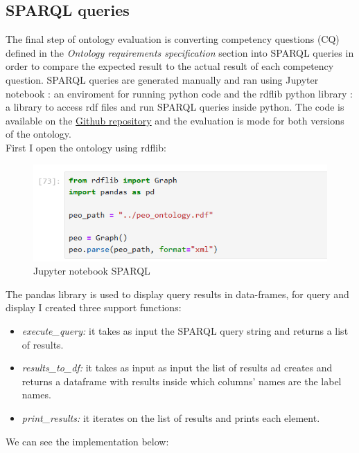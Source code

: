 \subsection{SPARQL queries}
The final step of ontology evaluation is converting competency questions (CQ) defined in the \textit{Ontology requirements specification} section into SPARQL queries in order to compare the expected result to the actual result of each competency question. SPARQL queries are generated manually and ran using Jupyter notebook \cite{jupyter}: an enviroment for running python code and the rdflib python library \cite{rdflib}: a library to access rdf files and run SPARQL queries inside python. The code is available on the \href{https://github.com/simonegramegna/peo/tree/main/evaluation}{Github repository} and the evaluation is mode for both versions of the ontology.\\
First I open the ontology using rdflib:
\begin{figure}[H]
    \centering
    \includegraphics[width=0.9\linewidth]{Figures/fig_45.png}
    \caption{Jupyter notebook SPARQL}
    \label{fig:enter-label}
\end{figure}
The pandas library is used to display query results in data-frames, for query and display I created three support functions: 
\begin{itemize}
    \item \textit{execute\_query:} it takes as input the SPARQL query string and returns a list of results.

    \item \textit{results\_to\_df:} it takes as input as input the list of results ad creates and returns a dataframe with results inside which columns' names are the label names.

    \item \textit{print\_results:} it iterates on the list of results and prints each element.
\end{itemize}
We can see the implementation below:
